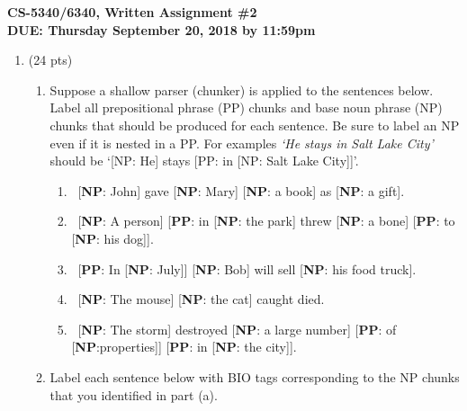 \documentclass[11pt]{article}
\newcommand{\np}{\textbf{NP}}
\newcommand{\pp}{\textbf{PP}}
\begin{document}
\large
\begin{center}
{\bf CS-5340/6340, Written Assignment \#2} \\
{\bf DUE: Thursday September 20, 2018 by 11:59pm}
\end{center}
\normalsize

\begin{enumerate}  



\item (24 pts)
\begin{enumerate} 

\item Suppose a shallow parser (chunker) is applied to the sentences
  below. Label all prepositional phrase (PP) chunks and base noun
  phrase (NP) chunks that should be produced for each sentence. Be sure
  to label an NP even if it is nested in a PP. For examples {\it `He stays
  in Salt Lake City'} should be `[NP: He] stays [PP: in [NP: Salt Lake
  City]]'. \\

\begin{enumerate}

\item~[\np: John] gave [\np: Mary] [\np: a book] as [\np: a gift].
\vspace*{.3in}

\item~[\np: A person] [\pp: in [\np: the park] threw [\np: a bone] [\pp: to [\np: his dog]].
\vspace*{.3in}

\item~[\pp: In [\np: July]] [\np: Bob] will sell [\np: his food truck].
\vspace*{.3in} 

\item~[\np: The mouse] [\np: the cat] caught died.
\vspace*{.3in}

\item~[\np: The storm] destroyed [\np: a large number] [\pp: of [\np:properties]] [\pp: in [\np: the city]]. 
\vspace*{.3in}


\end{enumerate}
\item Label each sentence below with BIO tags corresponding to the NP
  chunks that you identified in part (a). \\


\begin{enumerate}


\end{enumerate}
\end{enumerate}
\end{enumerate}
\end{document}

